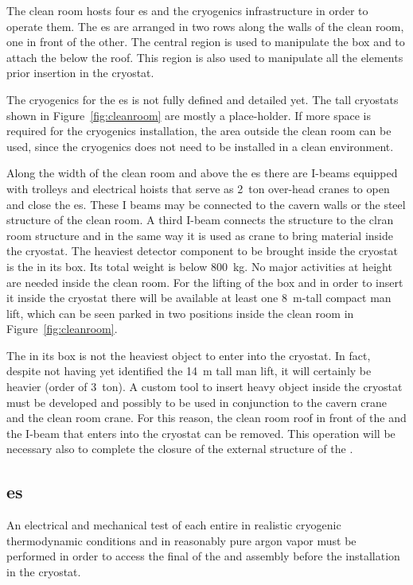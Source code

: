 The clean room hosts four \coldbox{}es and the cryogenics infrastructure in order to operate them.
The  \coldbox{}es are arranged in two rows along the walls of the clean room, one in front of the other.
The central region is used to manipulate the  box and to attach the  below the  \coldbox roof.
This region is also used to manipulate all the elements prior insertion in the cryostat.

The cryogenics for the \coldbox{}es is not fully defined and detailed yet.
The tall cryostats shown in Figure~\ref{fig:cleanroom} are mostly a place-holder.
If more space is required for the cryogenics installation, the area outside the clean room can be used, since the cryogenics does not need to be installed in a clean environment.

Along the width of the clean room and above the \coldbox{}es there are I-beams equipped with trolleys and electrical hoists that serve as 2~ton over-head cranes to open and close the  \coldbox{}es.
These I beams may be connected to the cavern walls or the steel structure of the clean room.
A third I-beam connects the  structure to the clran room structure and in the same way it is used as crane to bring material inside the cryostat.
The heaviest detector component to be brought inside the cryostat is the  in its box.
Its total weight is below 800~kg.
No major activities at height are needed inside the clean room.
For the lifting of the  box and in order to insert it inside the cryostat there will be available at least one 8~m-tall compact man lift, which can be seen parked in two positions inside the clean room in Figure~\ref{fig:cleanroom}.

The  in its box is not the heaviest object to enter into the cryostat.
In fact, despite not having yet identified the 14~m tall man lift, it will certainly be heavier (order of 3~ton).
A custom tool to insert heavy object inside the cryostat must be developed and possibly to be used in conjunction to the cavern crane and the clean room crane.
For this reason, the clean room roof in front of the  and the I-beam that enters into the cryostat can be removed.
This operation will be necessary also to complete the closure of the external structure of the .

\subsection{ \coldbox{}es}
An electrical and mechanical test of each entire  in realistic cryogenic thermodynamic conditions and in reasonably pure argon vapor must be performed in order to access the final  of the  and  assembly before the installation in the cryostat.


